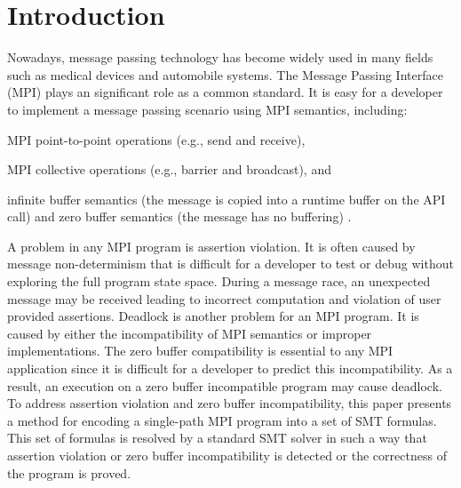 \section{Introduction}
Nowadays, message passing technology has become widely used in many fields such as medical devices and automobile systems. The Message Passing Interface (MPI) plays an significant role as a common standard. It is easy for a developer to implement a message passing scenario using MPI semantics, including:

\begin{compactitem}
\item MPI point-to-point operations (e.g., send and receive),
\item MPI collective operations (e.g., barrier and broadcast), and
\item infinite buffer semantics (the message is copied into a runtime buffer on the API call) and zero buffer semantics (the message has no buffering) \cite{DBLP:conf/fm/VakkalankaVGK09}.
\end{compactitem}

A problem in any MPI program is assertion violation. It is often caused by message non-determinism that is difficult for a developer to test or debug without exploring the full program state space. During a message race, an unexpected message may be received leading to incorrect computation and violation of user provided assertions. Deadlock is another problem for an MPI program. It is caused by either the incompatibility of MPI semantics or improper implementations. The zero buffer compatibility is essential to any MPI application since it is difficult for a developer to predict this incompatibility. As a result, an execution on a zero buffer incompatible program may cause deadlock. To address assertion violation and zero buffer incompatibility, this paper presents a method for encoding a single-path MPI program into a set of SMT formulas. This set of formulas is resolved by a standard SMT solver in such a way that assertion violation or zero buffer incompatibility is detected or the correctness of the program is proved. 

